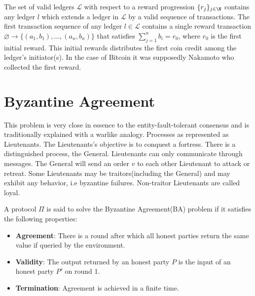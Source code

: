 \documentclass[..]{subfiles}
\begin{document}
The set of valid ledgers $\mathcal{L}$ with respect to a reward progression $\{r_j\}_{j \in \N}$ contains any ledger $l$ which extends a ledger in $\mathcal{L}$ by a valid sequence of transactions. The first transaction sequence of any ledger $l \in \mathcal{L}$ contains a single reward transaction $\varnothing \rightarrow \{(a_1, b_1), \dots, (a_n, b_n)\}$ that satisfies $\sum_{j=1}^{n}{b_i} = r_0$, where $r_0$ is the first initial reward. This initial rewards distributes the first coin credit among the ledger's initiator(s). In the case of Bitcoin it was supposedly Nakamoto who collected the first reward.




\section{Byzantine Agreement}

This problem is very close in essence to the entity-fault-tolerant consensus and is traditionally explained with a warlike analogy. Processes as represented as Lieutenants. The Lieutenants's objective is to conquest a fortress. There is a distinguished process, the General. Lieutenants can only communicate through messages. The General will send an order $v$ to each other Lieutenant to attack or retreat. Some Lieutenants may be traitors(including the General) and may exhibit any behavior, i.e byzantine failures\footnotemark. Non-traitor Lieutenants are called loyal.

\begin{definition}
	A protocol $\Pi$ is said to solve the Byzantine Agreement(BA) problem if it satisfies the following properties:
	\begin{itemize}
		\item \textbf{Agreement}: There is a round after which all honest parties return the same value if queried by the environment.
		\item \textbf{Validity}: The output returned by an honest party $P$ is the input of an honest party $P'$ on round 1.
		\item \textbf{Termination}: Agreement is achieved in a finite time.
	\end{itemize}
\end{definition}
\end{document}
